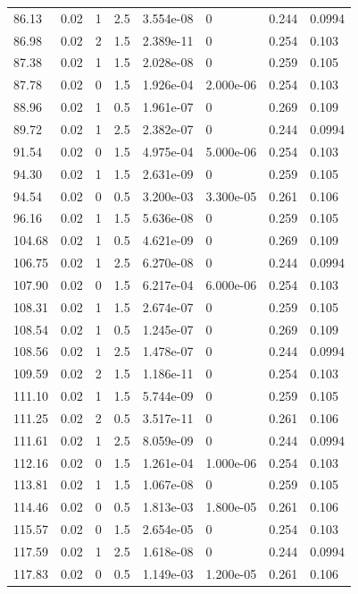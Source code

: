 \documentclass[preview]{standalone}
\begin{document}
{{{\begin{tabular}{L{1.2cm}C{1.2cm} C{0.3cm}C{0.5cm} C{1.4cm}C{1.4cm} C{1.4cm}C{1.4cm}}
  86.13  &  0.02  & 1     & 2.5 &  3.554e-08  & 0  & 0.244 &  0.0994   \\ 
  86.98  &  0.02  & 2     & 1.5 &  2.389e-11  & 0  & 0.254 &  0.103   \\ 
  87.38  &  0.02  & 1     & 1.5 &  2.028e-08  & 0  & 0.259 &  0.105   \\ 
  87.78  &  0.02  & 0     & 1.5 &  1.926e-04  & 2.000e-06  & 0.254 &  0.103   \\ 
  88.96  &  0.02  & 1     & 0.5 &  1.961e-07  & 0  & 0.269 &  0.109   \\ 
  89.72  &  0.02  & 1     & 2.5 &  2.382e-07  & 0  & 0.244 &  0.0994   \\ 
  91.54  &  0.02  & 0     & 1.5 &  4.975e-04  & 5.000e-06  & 0.254 &  0.103   \\ 
  94.30  &  0.02  & 1     & 1.5 &  2.631e-09  & 0  & 0.259 &  0.105   \\ 
  94.54  &  0.02  & 0     & 0.5 &  3.200e-03  & 3.300e-05  & 0.261 &  0.106   \\ 
  96.16  &  0.02  & 1     & 1.5 &  5.636e-08  & 0  & 0.259 &  0.105   \\ 
  104.68  &  0.02  & 1     & 0.5 &  4.621e-09  & 0  & 0.269 &  0.109   \\ 
  106.75  &  0.02  & 1     & 2.5 &  6.270e-08  & 0  & 0.244 &  0.0994   \\ 
  107.90  &  0.02  & 0     & 1.5 &  6.217e-04  & 6.000e-06  & 0.254 &  0.103   \\ 
  108.31  &  0.02  & 1     & 1.5 &  2.674e-07  & 0  & 0.259 &  0.105   \\ 
  108.54  &  0.02  & 1     & 0.5 &  1.245e-07  & 0  & 0.269 &  0.109   \\ 
  108.56  &  0.02  & 1     & 2.5 &  1.478e-07  & 0  & 0.244 &  0.0994   \\ 
  109.59  &  0.02  & 2     & 1.5 &  1.186e-11  & 0  & 0.254 &  0.103   \\ 
  111.10  &  0.02  & 1     & 1.5 &  5.744e-09  & 0  & 0.259 &  0.105   \\ 
  111.25  &  0.02  & 2     & 0.5 &  3.517e-11  & 0  & 0.261 &  0.106   \\ 
  111.61  &  0.02  & 1     & 2.5 &  8.059e-09  & 0  & 0.244 &  0.0994   \\ 
  112.16  &  0.02  & 0     & 1.5 &  1.261e-04  & 1.000e-06  & 0.254 &  0.103   \\ 
  113.81  &  0.02  & 1     & 1.5 &  1.067e-08  & 0  & 0.259 &  0.105   \\ 
  114.46  &  0.02  & 0     & 0.5 &  1.813e-03  & 1.800e-05  & 0.261 &  0.106   \\ 
  115.57  &  0.02  & 0     & 1.5 &  2.654e-05  & 0  & 0.254 &  0.103   \\ 
  117.59  &  0.02  & 1     & 2.5 &  1.618e-08  & 0  & 0.244 &  0.0994   \\ 
  117.83  &  0.02  & 0     & 0.5 &  1.149e-03  & 1.200e-05  & 0.261 &  0.106   \\ 
\hline 
\end{tabular} 

}}}
\end{document}
